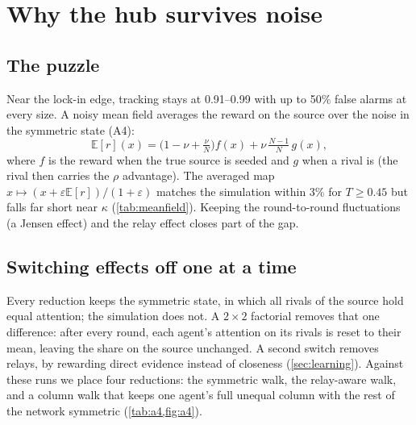 \section{Why the hub survives noise}\label{sec:robustness}

\subsection{The puzzle}
Near the lock-in edge, tracking stays at 0.91--0.99 with up to 50\% false alarms at every size. A noisy mean field
averages the reward on the source over the noise in the symmetric state (A4):
\begin{equation}
  \mathbb E[r](x)=\Big(1-\nu+\tfrac{\nu}{N}\Big)f(x)+\nu\,\tfrac{N-1}{N}\,g(x),
\end{equation}
where $f$ is the reward when the true source is seeded and $g$ when a rival is (the rival then carries the $\rho$
advantage). The averaged map $x\mapsto(x+\varepsilon\mathbb E[r])/(1+\varepsilon)$ matches the simulation within 3\%
for $T\ge0.45$ but falls far short near $\kappa$ (\cref{tab:meanfield}). Keeping the round-to-round fluctuations (a
Jensen effect) and the relay effect closes part of the gap.

\begin{table}[tbp]\centering\small
\caption{Tracking: simulation (E8) against the averaged mean field, the fluctuating walk and the relay-aware walk.}\label{tab:meanfield}

\end{table}

\subsection{Switching effects off one at a time}
Every reduction keeps the symmetric state, in which all rivals of the source hold equal attention; the simulation does
not. A $2\times2$ factorial removes that one difference: after every round, each agent's attention on its rivals is reset
to their mean, leaving the share on the source unchanged. A second switch removes relays, by rewarding direct evidence
instead of closeness (\cref{sec:learning}). Against these runs we place four reductions: the symmetric walk, the
relay-aware walk, and a column walk that keeps one agent's full unequal column with the rest of the network symmetric
(\cref{tab:a4,fig:a4}).



